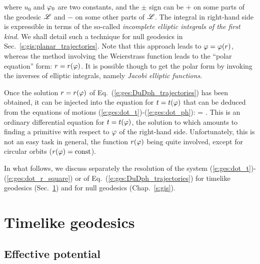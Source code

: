\begin{itemize}
\ee
where $u_0$ and $\varphi_0$ are two constants, and the $\pm$ sign can be $+$
on some parts of the geodesic $\mathscr{L}$ and $-$ on some other parts of $\mathscr{L}$.
The integral in right-hand side is expressible in terms of the so-called
\emph{incomplete elliptic integrals
of the first kind}.
We shall detail such a technique for null geodesics in Sec.~\ref{s:gis:planar_trajectories}.
Note that this approach leads to $\varphi = \varphi(r)$, whereas the method involving the
Weierstrass function leads to the ``polar equation'' form: $r = r(\varphi)$. It is possible though to
get the polar form by invoking the inverses of elliptic integrals, namely
\emph{Jacobi elliptic functions}.
\end{itemize}

Once the solution $r=r(\varphi)$ of Eq.~(\ref{e:ges:DuDph_trajectories})
has been obtained, it can be injected into the equation for $t = t(\varphi)$
that can be deduced from the equations of motions (\ref{e:ges:dot_t})-(\ref{e:ges:dot_ph}):
\be
     =   .
\ee
This is an ordinary differential equation for $t=t(\varphi)$, the solution to
which amounts to finding a primitive with respect to $\varphi$ of the
right-hand side. Unfortunately, this is not an easy task in general, the function
$r(\varphi)$ being quite involved, except for circular orbits ($r(\varphi)=\mathrm{const}$).

In what follows, we discuss separately the resolution of
the system (\ref{e:ges:dot_t})-(\ref{e:ges:dot_r_square}) or of
Eq.~(\ref{e:ges:DuDph_trajectories})
for timelike geodesics
(Sec.~\ref{s:ges:timelike}) and for null geodesics (Chap.~\ref{s:gis}).


\section{Timelike geodesics} \label{s:ges:timelike}

\subsection{Effective potential} \label{s:ges:eff_pot_timelike}

